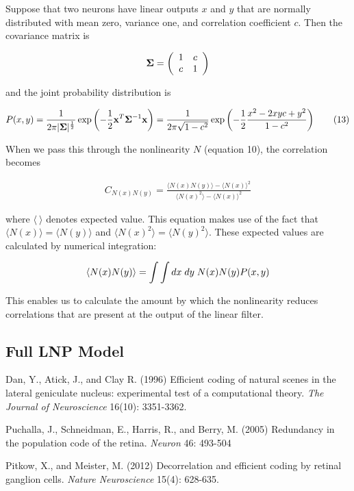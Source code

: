 \documentclass[12pt]{article}
\begin{document}
Suppose that two neurons have linear outputs $x$ and $y$ that are normally distributed with mean zero, variance one, and correlation coefficient $c$. Then the covariance matrix is

\[ {\bf\Sigma} = \left( \begin{array}{cc}
1 & c \\
c & 1 \\
\end{array} \right) \]

\noindent and the joint probability distribution is

\begin{align}
\displaystyle P(x,y) = \frac{1}{2\pi |{\bf \Sigma}|^{\frac{1}{2}}}\exp\left( -\frac{1}{2}{\bf x}^T {\bf \Sigma}^{-1} {\bf x}\right)=\frac{1}{2\pi \sqrt{1-c^2}}\exp\left( -\frac{1}{2}\frac{x^2-2xyc+y^2}{1-c^2}\right) \tag{13}
\end{align}

\noindent When we pass this through the nonlinearity $N$ (equation 10), the correlation becomes

\begin{align}
\displaystyle C_{N(x)N(y)} = \frac{\langle N(x)N(y)\rangle- \langle N(x)\rangle^2}{\langle N(x)^2 \rangle - \langle N(x) \rangle^2} \tag{12}
\end{align}

\noindent where $\langle \:\rangle$ denotes expected value. This equation makes use of the fact that $\langle N(x) \rangle = \langle N(y) \rangle$ and $\langle N(x)^2 \rangle = \langle N(y)^2 \rangle$. These expected values are calculated by numerical integration:

\begin{align}
\langle N(x)N(y) \rangle = \int \int dx\;dy\;N(x)N(y)P(x,y) \notag
\end{align}

\noindent This enables us to calculate the amount by which the nonlinearity reduces correlations that are present at the output of the linear filter.

\subsection{Full LNP Model}



\newpage
\begin{thebibliography}{9}


 Dan, Y., Atick, J., and Clay R. (1996) Efficient coding of natural scenes in the lateral geniculate nucleus: experimental test of a computational theory. \textit{The Journal of Neuroscience} 16(10): 3351-3362.

 Puchalla, J., Schneidman, E., Harris, R., and Berry, M. (2005) Redundancy in the population code of the retina. \textit{Neuron} 46: 493-504

 Pitkow, X., and Meister, M. (2012) Decorrelation and efficient coding by retinal ganglion cells. \textit{Nature Neuroscience} 15(4): 628-635.


\end{thebibliography}
\end{document}
